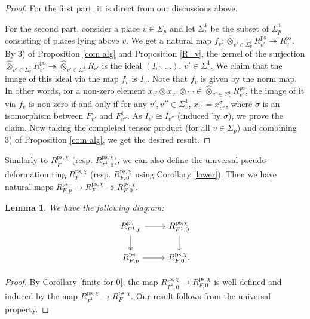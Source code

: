 \documentclass[a4paper, 12pt]{amsart}
\newtheorem{lem}[thm]{Lemma}
\def\ps{\mathrm{ps}}
\begin{document}
    \begin{proof}
     	For the first part, it is direct from our discussions above.
     	
     	For the second part, consider a place $v \in \Sigma_p$ and let $\Sigma^1_v$ be the subset of $\Sigma_p^1$ consisting of places lying above $v$. We get a natural map $f_v: \widehat{\otimes}_{v' \in \Sigma^1_v} R_{v'}^\ps \twoheadrightarrow R_v^\ps$. By 3) of Proposition \ref{com alg} and Proposition \ref{R_v}, the kernel of the surjection $ \widehat{\otimes}_{v' \in \Sigma^1_v} R_{v'}^\ps \twoheadrightarrow \widehat{\otimes}_{v' \in \Sigma^1_v} R_{v'}$ is the ideal $(I_{v'}, \dots)$, $v' \in \Sigma_v^1$. We claim that the image of this ideal via the map $f_v$ is $I_v$. Note that $f_v$ is given by the norm map. In other words, for a non-zero element $x_{v'} \otimes x_{v''} \otimes \cdots \in \widehat{\otimes}_{v' \in \Sigma^1_v} R_{v'}^\ps$, the image of it via $f_v$ is non-zero if and only if for any $v', v'' \in \Sigma_v^1 $, $x_{v'}=x_{v''}^\sigma$, where $\sigma$ is an isomorphism between $F_{v'}^1$ and $F_{v''}^1$. As $I_{v'}\cong I_{v''}$ (induced by $\sigma$), we prove the claim. Now taking the completed tensor product (for all $v \in \Sigma_p$) and combining 3) of Proposition \ref{com alg}, we get the desired result.
    \end{proof}
    
    Similarly to $R_{F^1}^{\ps, \chi}$ (resp. $R_{F^1,0}^{\ps, \chi} $), we can also define the universal pseudo-deformation ring $R_{F}^{\ps, \chi} $ (resp. $R_{F, 0}^{\ps, \chi} $ using Corollary \ref{lower}). Then we have natural maps $R_{F,p}^\ps \to R_{F}^{\ps, \chi} \twoheadrightarrow R_{F, 0}^{\ps, \chi}$.
    
    \begin{lem}\label{com dia2}
    	We have the following diagram:
    	\[\begin{tikzcd}
    		R_{F^1,p}^\ps  \arrow[r] \arrow[d, two heads]& R_{F^1,0}^{\ps, \chi} \arrow[d]\\
    		R_{F,p}^\ps \arrow[r] & R_{F, 0}^{\ps, \chi}.
    	\end{tikzcd}\]
    \end{lem}
    
    \begin{proof}
    	By Corollary \ref{finite for 0}, the map $R_{F^1,0}^{\ps, \chi} \to R_{F, 0}^{\ps, \chi} $ is well-defined and induced by the map $ R_{F^1}^{\ps, \chi} \to R_{F}^{\ps, \chi}$. Our result follows from the universal property.
    \end{proof}
    
\end{document}
